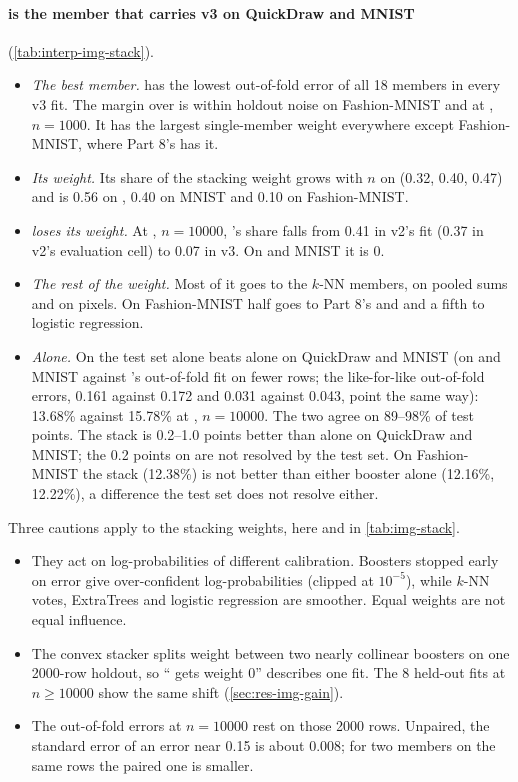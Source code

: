 \paragraph{ is the member that carries v3 on QuickDraw and MNIST}  (\cref{tab:interp-img-stack}).
\begin{itemize}
\item \emph{The best member.}  has the lowest out-of-fold error of all 18 members in every v3 fit. The margin over  is within holdout noise on Fashion-MNIST and at , $n=1000$. It has the largest single-member weight everywhere except Fashion-MNIST, where Part 8's  has it.
\item \emph{Its weight.} Its share of the stacking weight grows with $n$ on  (0.32, 0.40, 0.47) and is 0.56 on , 0.40 on MNIST and 0.10 on Fashion-MNIST.
\item \emph{ loses its weight.} At , $n=10000$, 's share falls from 0.41 in v2's fit (0.37 in v2's evaluation cell) to 0.07 in v3. On  and MNIST it is 0.
\item \emph{The rest of the weight.} Most of it goes to the $k$-NN members, on pooled sums and on pixels. On Fashion-MNIST half goes to Part 8's  and  and a fifth to logistic regression.
\item \emph{Alone.} On the test set  alone beats  alone on QuickDraw and MNIST (on  and MNIST against 's out-of-fold fit on fewer rows; the like-for-like out-of-fold errors, 0.161 against 0.172 and 0.031 against 0.043, point the same way): 13.68\% against 15.78\% at , $n=10000$. The two agree on 89--98\% of test points. The stack is 0.2--1.0 points better than  alone on QuickDraw and MNIST; the 0.2 points on  are not resolved by the test set. On Fashion-MNIST the stack (12.38\%) is not better than either booster alone (12.16\%, 12.22\%), a difference the test set does not resolve either.
\end{itemize}
Three cautions apply to the stacking weights, here and in \cref{tab:img-stack}.
\begin{itemize}
\item They act on log-probabilities of different calibration. Boosters stopped early on error give over-confident log-probabilities (clipped at $10^{-5}$), while $k$-NN votes, ExtraTrees and logistic regression are smoother. Equal weights are not equal influence.
\item The convex stacker splits weight between two nearly collinear boosters on one 2000-row holdout, so `` gets weight 0'' describes one fit. The 8 held-out fits at $n\ge10000$ show the same shift (\cref{sec:res-img-gain}).
\item The out-of-fold errors at $n=10000$ rest on those 2000 rows. Unpaired, the standard error of an error near 0.15 is about 0.008; for two members on the same rows the paired one is smaller.
\end{itemize}

